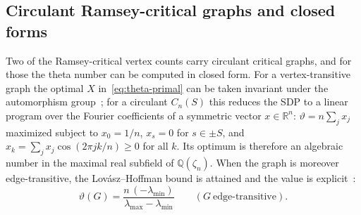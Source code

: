 \documentclass[11pt]{article}
\renewcommand{\theta}{\vartheta}
\begin{document}
\subsection{Circulant Ramsey-critical graphs and closed forms}\label{sec:circ}

Two of the Ramsey-critical vertex counts carry circulant critical graphs, and for those the theta number can be computed in closed form. For a vertex-transitive graph the optimal $X$ in~\eqref{eq:theta-primal} can be taken invariant under the automorphism group~\cite{lovasz1979}; for a circulant $C_n(S)$ this reduces the SDP to a linear program over the Fourier coefficients of a symmetric vector $x\in\mathbb R^n$: $\theta=n\sum_j x_j$ maximized subject to $x_0=1/n$, $x_s=0$ for $s\in\pm S$, and $\hat x_k=\sum_j x_j\cos(2\pi jk/n)\ge0$ for all $k$. Its optimum is therefore an algebraic number in the maximal real subfield of $\mathbb Q(\zeta_n)$. When the graph is moreover edge-transitive, the Lov\'asz--Hoffman bound is attained and the value is explicit~\cite{lovasz1979}:
\begin{equation}\label{eq:hoffman}
\theta(G)=\frac{n\,(-\lambda_{\min})}{\lambda_{\max}-\lambda_{\min}}\qquad(G\ \text{edge-transitive}).
\end{equation}
\end{document}
